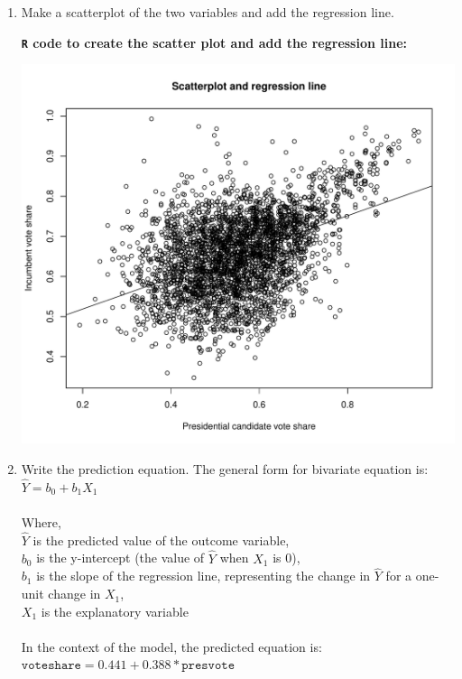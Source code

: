 \documentclass[12pt,letterpaper]{article}
\begin{document}
\begin{enumerate}
		\item Make a scatterplot of the two variables and add the regression line. 
		
		\textbf{\texttt{R} code to create the scatter plot and add the regression line:}
		  
		
		\begin{center}
			\includegraphics[width=14cm]{plot3.pdf}  
		\end{center}

		\item Write the prediction equation.
		\noindent The general form for bivariate equation is:
		$\hat{Y} = b_0 + b_1 X_1$\\
		\\Where,\\
		$\hat{Y}$ is the predicted value of the outcome variable,\\
		$b_0$ is the y-intercept (the value of $\hat{Y}$ when $X_1$ is 0),\\
		$b_1$ is the slope of the regression line, representing the change in $\hat{Y}$ for a one-unit change in $X_1$,\\
		$X_1$ is the explanatory variable\\
		\\
		In the context of the model, the predicted equation is:\\
		\textit{$\texttt{voteshare} = 0.441 + 0.388*\texttt{presvote}$}

	\end{enumerate}
	
\end{document}
